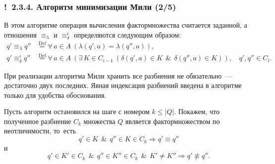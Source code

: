 \documentclass[mathserif,12pt,aspectratio=169]{beamer}
\def\Def{\stackrel{\text{Def}}{=}}
\def\A#1#2{\forall\,#1\ \left(#2\right)}
\def\E#1#2{\exists\,#1\ \left(#2\right)}
\let\Impl\Longrightarrow
\def\And{\operatorname{\,\&\,}}
\let\leq\leqslant
\def\Ok{{\color{green}\textbf{!}\ }}
\begin{document}
\begin{frame}
\frametitle{\Ok 2.3.4. Алгоритм минимизации Мили (2/5)}

В  этом алгоритме операция вычисления фактормножества
считается заданной, а отношения $\equiv_\lambda$ и $\equiv_\delta^i$
определяются следующим образом:
\begin{align*}
q'\equiv_\lambda q''& \Def \A{a\in A}{\lambda(q',a)=\lambda(q'', a)},\\
q'\equiv_\delta^i q''&\Def 
\A{a \in A}{\E{ K\in C_{i-1}}{
{\delta(q', a)\in K \And  \delta(q'',a)\in K}}},
\quad q',q'' \in C_i.
\end{align*}

\begin{remark}
При реализации алгоритма Мили хранить все разбиения не
обязательно~--- достаточно двух последних.
Явная индексация разбиений введена в алгоритме
только для удобства обоснования.
\end{remark}

\begin{ground}
Пусть алгоритм остановился на шаге с номером $k\leq|Q|$. Покажем,
что полученное разбиение $C_k$ множества $Q$ является
фактормножеством по неотличимости, то~есть
$$
q'\in K \And  q''
\in K \in C_k \Impl q'\equiv q''
$$
и
$$
q'\in K'\in C_k \And  q''
\in K'' \in C_k \And  K'\neq K'' \Impl q'\not\equiv q''.
$$

\vspace{-\baselineskip}
\end{ground}
\end{frame}
\end{document}
